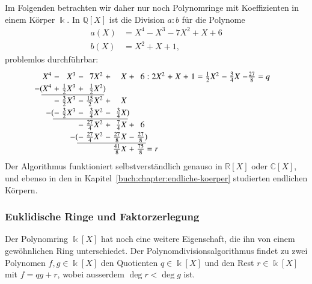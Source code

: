 Im Folgenden betrachten wir daher nur noch Polynomringe mit Koeffizienten
in einem Körper $\Bbbk$.
In $\mathbb{Q}[X]$ ist die Division $a:b$ für die Polynome
\begin{equation}
\begin{aligned}
a(X) &= X^4 - X^3 -7X^2 + X + 6\\
b(X) &= X^2+X+1,
\end{aligned}
\label{buch:polynome:eqn:divisionsaufgabe}
\end{equation}
problemlos durchführbar:
\[
\arraycolsep=1.4pt
\renewcommand{\arraystretch}{1.2}
\begin{array}{rcrcrcrcrcrcrcrcrcrcr}
X^4&-&       X^3&-&         7X^2&+&          X&+&           6&:&2X^2&+&X&+&1&=&\frac12X^2&-&\frac34X&-\frac{27}{8} = q\\
\llap{$-($}X^4&+&\frac12X^3&+&   \frac12X^2\rlap{$)$}& &           & &            & &    & & & & & &          & &        &             \\ \cline{1-5}
   &-&\frac32X^3&-&\frac{15}2X^2&+&          X& &            & &    & & & & & &          & &        &             \\
   &\llap{$-($}-&\frac32X^3&-&\frac{ 3}4X^2&-&\frac{ 3}4X\rlap{$)$}& &            & &    & & & & & &          & &        &             \\\cline{2-7}
   & &          &-&\frac{27}4X^2&+&\frac{ 7}4X&+&           6& &    & & & & & &          & &        &             \\
   & &          &\llap{$-($}-&\frac{27}4X^2&-&\frac{27}8X&-&\frac{27}{8}\rlap{$)$}& &    & & & & & &          & &        &             \\\cline{4-9}
   & &          & &             & &\frac{41}8X&+&\frac{75}{8}\rlap{$\mathstrut=r$}& &    & & & & & &          & &        &             \\
\end{array}
\]
Der Algorithmus funktioniert selbstverständlich genauso in $\mathbb{R}[X]$
oder $\mathbb{C}[X]$, und ebenso in den in
Kapitel~\ref{buch:chapter:endliche-koerper} studierten endlichen Körpern.

\subsubsection{Euklidische Ringe und Faktorzerlegung}
Der Polynomring $\Bbbk[X]$ hat noch eine weitere Eigenschaft, die ihn
von einem gewöhnlichen Ring unterschiedet.
Der Polynomdivisionsalgorithmus findet zu zwei Polynomen $f,g\in\Bbbk[X]$
den Quotienten $q\in\Bbbk[X]$ und den Rest $r\in\Bbbk[X]$ mit
$f=qg+r$, wobei ausserdem $\deg r<\deg g$ ist.

